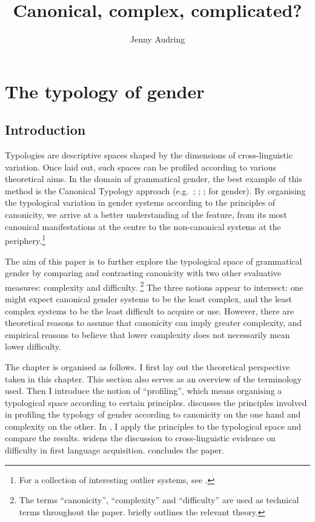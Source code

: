 \documentclass[output=collectionpaper]{langsci/langscibook}
\title{Canonical, complex, complicated?}
\author{%
Jenny Audring
\affiliation{Leiden University}
}%
\begin{document}
\section{The typology of gender}

\subsection{Introduction}

Typologies are descriptive spaces shaped by the dimensions of cross-linguistic variation. Once laid out, such spaces can be profiled according to various theoretical aims. In the domain of grammatical gender, the best example of this method is the Canonical Typology approach (e.g.\ \citealt{Corbett2006}; \citealt{Brown2013}; \citealt{Bond2019}; \citealt{Corbett2016} for gender). By organising the typological variation in gender systems according to the principles of canonicity, we arrive at a better understanding of the feature, from its most canonical manifestations at the centre to the non-canonical systems at the periphery.\footnote{For a collection of interesting outlier systems, see \citet{Fedden2018}.}

The aim of this paper is to further explore the typological space of grammatical gender by comparing and contrasting canonicity with two other evaluative measures: complexity and difficulty.%
\footnote{The terms ``canonicity'', ``complexity'' and ``difficulty'' are used as technical terms throughout the paper.  briefly outlines the relevant theory.} %
The three notions appear to intersect: one might expect canonical gender systems to be the least complex, and the least complex systems to be the least difficult to acquire or use. However, there are theoretical reasons to assume that canonicity can imply greater complexity, and empirical reasons to believe that lower complexity does not necessarily mean lower difficulty.

The chapter is organised as follows. I first lay out the theoretical perspective taken in this chapter. This section also serves as an overview of the terminology used. Then I introduce the notion of ``profiling'', which means organising a typological space according to certain principles.  discusses the principles involved in profiling the typology of gender according to canonicity on the one hand and complexity on the other. In , I apply the principles to the typological space and compare the results.  widens the discussion to cross-linguistic evidence on difficulty in first language acquisition.  concludes the paper.
\end{document}
